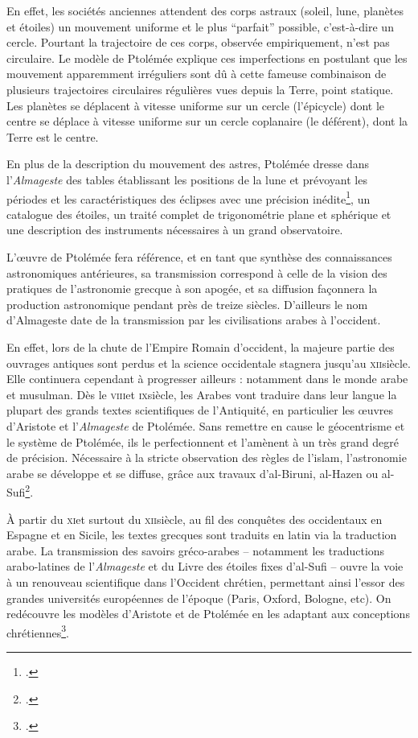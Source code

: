 En effet, les sociétés anciennes attendent des
corps astraux (soleil, lune, planètes et étoiles) un mouvement uniforme
et le plus ``parfait'' possible, c'est-à-dire un cercle. Pourtant la
trajectoire de ces corps, observée empiriquement, n'est pas circulaire.
Le modèle de Ptolémée explique ces imperfections en postulant que les
mouvement apparemment irréguliers sont dû à cette fameuse combinaison de
plusieurs trajectoires circulaires régulières vues depuis la Terre,
point statique. Les planètes se déplacent à vitesse uniforme sur un
cercle (l'épicycle) dont le centre se déplace à vitesse uniforme sur un
cercle coplanaire (le déférent), dont la Terre est le centre.

En plus de la description du mouvement des astres, Ptolémée dresse dans
l'\emph{Almageste} des tables établissant les positions de la lune et
prévoyant les périodes et les caractéristiques des éclipses avec une
précision inédite\footcite{raymond_jones_ptolemy_2024}, un catalogue des étoiles, un traité
complet de trigonométrie plane et sphérique et une description des
instruments nécessaires à un grand observatoire.

L'œuvre de Ptolémée fera référence, et en tant que synthèse des
connaissances astronomiques antérieures, sa transmission correspond
à celle de la vision des pratiques de l'astronomie grecque à son apogée,
et sa diffusion façonnera la production astronomique pendant
près de treize siècles. D'ailleurs le nom d'Almageste date de la
transmission par les civilisations arabes à l'occident.

En effet, lors de la chute de l'Empire Romain d'occident, la majeure
partie des ouvrages antiques sont perdus et la science occidentale
stagnera jusqu'au \textsc{xii}\ieme siècle. Elle continuera cependant à progresser
ailleurs : notamment dans le monde arabe et musulman. Dès le \textsc{viii}\ieme et
\textsc{ix}\ieme siècle, les Arabes vont traduire dans leur langue la plupart des
grands textes scientifiques de l'Antiquité, en particulier les œuvres
d'Aristote et l'\emph{Almageste} de Ptolémée. Sans remettre en cause le
géocentrisme et le système de Ptolémée, ils le perfectionnent et
l'amènent à un très grand degré de précision. Nécessaire à la stricte
observation des règles de l'islam, l'astronomie arabe se développe et se
diffuse, grâce aux travaux d'al-Biruni, al-Hazen ou al-Sufi\footcite{noauthor_monde_nodate}.

À partir du \textsc{xi}\ieme et surtout du \textsc{xii}\ieme siècle, au fil des conquêtes des
occidentaux en Espagne et en Sicile, les textes grecques sont traduits
en latin via la traduction arabe. La transmission des savoirs
gréco-arabes -- notamment les traductions arabo-latines de
l'\emph{Almageste} et du Livre des étoiles fixes d'al-Sufi -- ouvre la
voie à un renouveau scientifique dans l'Occident chrétien, permettant
ainsi l'essor des grandes universités européennes de l'époque (Paris,
Oxford, Bologne, etc). On redécouvre les modèles d'Aristote et de
Ptolémée en les adaptant aux conceptions chrétiennes\footcite[``Le
  système géocentrique devient le modèle astronomique et théologique de
  l'Église, qui ne remet pas en cause la sphéricité de la Terre''][]{noauthor_monde_nodate}.

